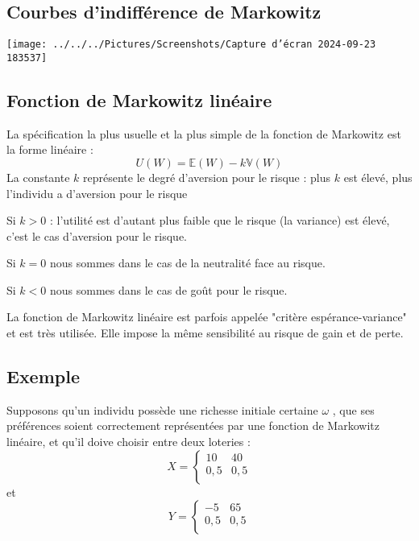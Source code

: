 \documentclass[a4paper, 12pt]{report}
\begin{document}
\subsection{Courbes d'indifférence de Markowitz}

\begin{center}
	\texttt{[image: ../../../Pictures/Screenshots/Capture d'écran 2024-09-23 183537]}
\end{center}

\subsection{Fonction de Markowitz linéaire}

La spécification la plus usuelle et la plus simple de la fonction de Markowitz est la forme linéaire :
$$
U(W)= \mathbb{E}(W)-k\mathbb{V}(W)
$$
La constante $k$ représente le degré d'aversion pour le risque : plus $k$ est élevé, plus l'individu a d'aversion pour le risque

Si $k>0$ : l'utilité est d'autant plus faible que le risque (la variance)
est élevé, c'est le cas d'aversion pour le risque.

Si $k=0$ nous sommes dans le cas de la neutralité face au risque.

Si $k<0$ nous sommes dans le cas de goût pour le risque. 

La fonction de Markowitz linéaire est parfois appelée "critère espérance-variance" et est très utilisée. Elle impose la même sensibilité au risque de gain et de perte. 

\subsection{Exemple}

Supposons qu'un individu possède une richesse initiale certaine $\omega$ , que ses préférences soient correctement représentées par une fonction de Markowitz linéaire, et qu'il doive choisir entre deux loteries :
$$
X= \left\{\begin{matrix}
	10 & 40 \\
	0,5 & 0,5 \\
\end{matrix}\right.
$$
et 
$$
Y= \left\{\begin{matrix}
	-5 & 65 \\
	0,5 & 0,5 \\
\end{matrix}\right.
$$
\end{document}
